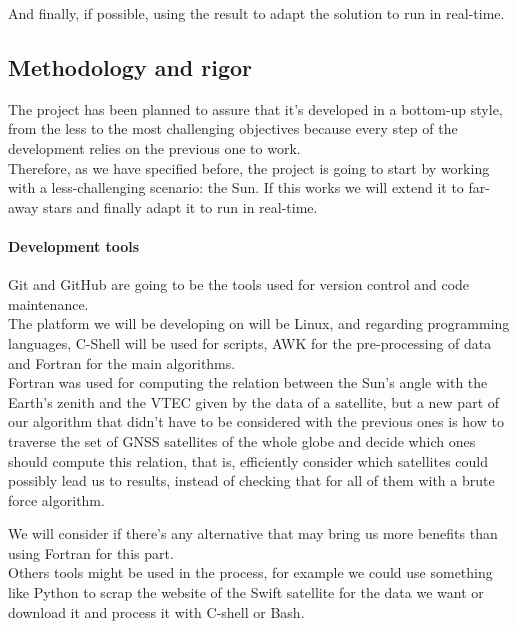 \documentclass[12pt]{article}
\begin{document}
And finally, if possible, using the result to adapt the solution to run in real-time.

\subsection{Methodology and rigor}

The project has been planned to assure that it’s developed in a bottom-up style, from the less to the most challenging objectives because every step of the development relies on the previous one to work.\\ 

Therefore, as we have specified before, the project is going to start by working with a less-challenging scenario: the Sun. If this works we will extend it to far-away stars and finally adapt it to run in real-time.

\paragraph{Development tools}

Git and GitHub are going to be the tools used for version control and code maintenance.\\

The platform we will be developing on will be Linux, and regarding programming languages, C-Shell will be used for scripts, AWK for the pre-processing of data and Fortran for the main algorithms. \\

Fortran was used for computing the relation between the Sun’s angle with the Earth’s zenith and the VTEC given by the data of a satellite, but a new part of our algorithm that didn’t have to be considered with the previous ones is how to traverse the set of GNSS satellites of the whole globe and decide which ones should compute this relation, that is, efficiently consider which satellites could possibly lead us to results, instead of checking that for all of them with a brute force algorithm.

We will consider if there’s any alternative that may bring us more benefits than using Fortran for this part. \\

Others tools might be used in the process, for example we could use something like Python to scrap the website of the Swift satellite for the data we want or download it and process it with C-shell or Bash.\\
\end{document}

